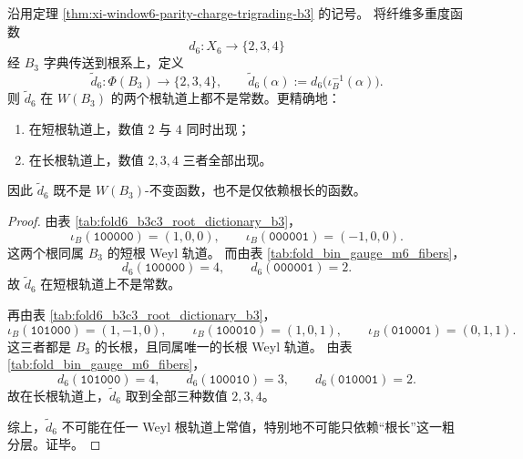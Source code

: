 \begin{theorem}\label{thm:xi-window6-fiber-multiplicity-weyl-breaking-b3}
沿用定理 \ref{thm:xi-window6-parity-charge-trigrading-b3} 的记号。
将纤维多重度函数
\[
d_6:X_6\to \{2,3,4\}
\]
经 \(B_3\) 字典传送到根系上，定义
\[
\widetilde d_6:\Phi(B_3)\to \{2,3,4\},
\qquad
\widetilde d_6(\alpha):=d_6\bigl(\iota_B^{-1}(\alpha)\bigr).
\]
则 \(\widetilde d_6\) 在 \(W(B_3)\) 的两个根轨道上都不是常数。更精确地：
\begin{enumerate}
  \item 在短根轨道上，数值 \(2\) 与 \(4\) 同时出现；
  \item 在长根轨道上，数值 \(2,3,4\) 三者全部出现。
\end{enumerate}
因此 \(\widetilde d_6\) 既不是 \(W(B_3)\)-不变函数，也不是仅依赖根长的函数。
\end{theorem}
\begin{proof}
由表 \ref{tab:fold6_b3c3_root_dictionary_b3}，
\[
\iota_B(\texttt{100000})=(1,0,0),
\qquad
\iota_B(\texttt{000001})=(-1,0,0).
\]
这两个根同属 \(B_3\) 的短根 Weyl 轨道。
而由表 \ref{tab:fold_bin_gauge_m6_fibers}，
\[
d_6(\texttt{100000})=4,
\qquad
d_6(\texttt{000001})=2.
\]
故 \(\widetilde d_6\) 在短根轨道上不是常数。
\par
再由表 \ref{tab:fold6_b3c3_root_dictionary_b3}，
\[
\iota_B(\texttt{101000})=(1,-1,0),\qquad
\iota_B(\texttt{100010})=(1,0,1),\qquad
\iota_B(\texttt{010001})=(0,1,1).
\]
这三者都是 \(B_3\) 的长根，且同属唯一的长根 Weyl 轨道。
由表 \ref{tab:fold_bin_gauge_m6_fibers}，
\[
d_6(\texttt{101000})=4,\qquad
d_6(\texttt{100010})=3,\qquad
d_6(\texttt{010001})=2.
\]
故在长根轨道上，\(\widetilde d_6\) 取到全部三种数值 \(2,3,4\)。
\par
综上，\(\widetilde d_6\) 不可能在任一 Weyl 根轨道上常值，特别地不可能只依赖“根长”这一粗分层。证毕。
\end{proof}

